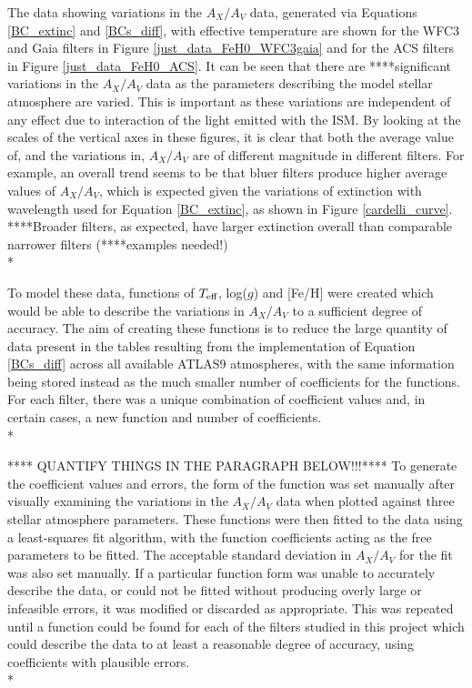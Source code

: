 \documentclass[12pt, a4paper]{report}
\begin{document}
The data showing variations in the $A_{X}/A_{V}$ data, generated via Equations \ref{BC_extinc} and \ref{BCs_diff}, with effective temperature are shown for the WFC3 and Gaia filters in Figure \ref{just_data_FeH0_WFC3gaia} and for the ACS filters in Figure \ref{just_data_FeH0_ACS}. It can be seen that there are ****significant variations in the $A_{X}/A_{V}$ data  as the parameters describing the model stellar atmosphere are varied. This is important as these variations are independent of any effect due to interaction of the light emitted with the ISM. By looking at the scales of the vertical axes in these figures, it is clear that both the average value of, and the variations in, $A_{X}/A_{V}$ are of different magnitude in different filters. For example, an overall trend seems to be that bluer filters produce higher average values of $A_{X}/A_{V}$, which is expected given the variations of extinction with wavelength used for Equation \ref{BC_extinc}, as shown in Figure \ref{cardelli_curve}. ****Broader filters, as expected, have larger extinction overall than comparable narrower filters (****examples needed!)\\*

To model these data, functions of $T_{\textnormal{eff}}$, log($g$) and [Fe/H] were created which would be able to describe the variations in $A_{X}/A_{V}$ to a sufficient degree of accuracy. The aim of creating these functions is to reduce the large quantity of data present in the tables resulting from the implementation of Equation \ref{BCs_diff} across all available ATLAS9 atmospheres, with the same information being stored instead as the much smaller number of coefficients for the functions. For each filter, there was a unique combination of coefficient values and, in certain cases, a new function and number of coefficients.\\*

**** QUANTIFY THINGS IN THE PARAGRAPH BELOW!!!****
To generate the coefficient values and errors, the form of the function was set manually after visually examining the variations in the $A_{X}/A_{V}$ data when plotted against three stellar atmosphere parameters. These functions were then fitted to the data using a least-squares fit algorithm, with the function coefficients acting as the free parameters to be fitted. The acceptable standard deviation in $A_{X}/A_{V}$ for the fit was also set manually. If a particular function form was unable to accurately describe the data, or could not be fitted without producing overly large or infeasible errors, it was modified or discarded as appropriate. This was repeated until a function could be found for each of the filters studied in this project which could  describe the data to at least a reasonable degree of accuracy, using coefficients with plausible errors.\\*
\end{document}
